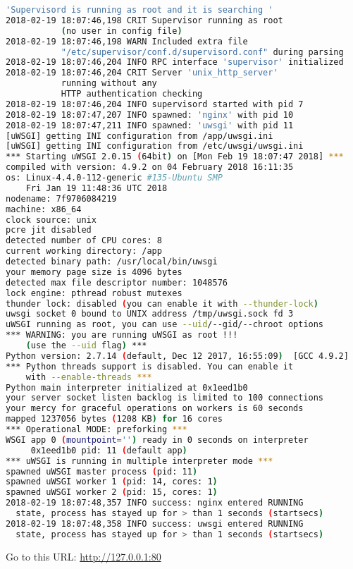 \begin{lstlisting}[language=bash]
'Supervisord is running as root and it is searching '
2018-02-19 18:07:46,198 CRIT Supervisor running as root 
           (no user in config file)
2018-02-19 18:07:46,198 WARN Included extra file
           "/etc/supervisor/conf.d/supervisord.conf" during parsing
2018-02-19 18:07:46,204 INFO RPC interface 'supervisor' initialized
2018-02-19 18:07:46,204 CRIT Server 'unix_http_server' 
           running without any
           HTTP authentication checking
2018-02-19 18:07:46,204 INFO supervisord started with pid 7
2018-02-19 18:07:47,207 INFO spawned: 'nginx' with pid 10
2018-02-19 18:07:47,211 INFO spawned: 'uwsgi' with pid 11
[uWSGI] getting INI configuration from /app/uwsgi.ini
[uWSGI] getting INI configuration from /etc/uwsgi/uwsgi.ini
*** Starting uWSGI 2.0.15 (64bit) on [Mon Feb 19 18:07:47 2018] ***
compiled with version: 4.9.2 on 04 February 2018 16:11:35
os: Linux-4.4.0-112-generic #135-Ubuntu SMP 
    Fri Jan 19 11:48:36 UTC 2018
nodename: 7f9706084219
machine: x86_64
clock source: unix
pcre jit disabled
detected number of CPU cores: 8
current working directory: /app
detected binary path: /usr/local/bin/uwsgi
your memory page size is 4096 bytes
detected max file descriptor number: 1048576
lock engine: pthread robust mutexes
thunder lock: disabled (you can enable it with --thunder-lock)
uwsgi socket 0 bound to UNIX address /tmp/uwsgi.sock fd 3
uWSGI running as root, you can use --uid/--gid/--chroot options
*** WARNING: you are running uWSGI as root !!! 
    (use the --uid flag) *** 
Python version: 2.7.14 (default, Dec 12 2017, 16:55:09)  [GCC 4.9.2]
*** Python threads support is disabled. You can enable it 
    with --enable-threads ***
Python main interpreter initialized at 0x1eed1b0
your server socket listen backlog is limited to 100 connections
your mercy for graceful operations on workers is 60 seconds
mapped 1237056 bytes (1208 KB) for 16 cores
*** Operational MODE: preforking ***
WSGI app 0 (mountpoint='') ready in 0 seconds on interpreter 
     0x1eed1b0 pid: 11 (default app)
*** uWSGI is running in multiple interpreter mode ***
spawned uWSGI master process (pid: 11)
spawned uWSGI worker 1 (pid: 14, cores: 1)
spawned uWSGI worker 2 (pid: 15, cores: 1)
2018-02-19 18:07:48,357 INFO success: nginx entered RUNNING 
  state, process has stayed up for > than 1 seconds (startsecs)
2018-02-19 18:07:48,358 INFO success: uwsgi entered RUNNING 
  state, process has stayed up for > than 1 seconds (startsecs)

\end{lstlisting}


Go to this URL: \url{http://127.0.0.1:80}

